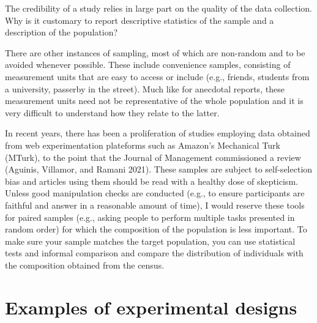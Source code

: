\documentclass[
  11pt,
  letterpaper,
]{scrbook}
\theoremstyle{definition}
\theoremstyle{definition}
\theoremstyle{remark}
\begin{document}
\begin{tcolorbox}[enhanced jigsaw, left=2mm, leftrule=.75mm, coltitle=black, breakable, bottomrule=.15mm, colframe=quarto-callout-note-color-frame, titlerule=0mm, colbacktitle=quarto-callout-note-color!10!white, rightrule=.15mm, toprule=.15mm, title=\textcolor{quarto-callout-note-color}{\faInfo}\hspace{0.5em}{Thinking outside the box}, opacityback=0, toptitle=1mm, bottomtitle=1mm, arc=.35mm, opacitybacktitle=0.6, colback=white]

The credibility of a study relies in large part on the quality of the
data collection. Why is it customary to report descriptive statistics of
the sample and a description of the population?

\end{tcolorbox}

There are other instances of sampling, most of which are non-random and
to be avoided whenever possible. These include convenience samples,
consisting of measurement units that are easy to access or include
(e.g., friends, students from a university, passerby in the street).
Much like for anecdotal reports, these measurement units need not be
representative of the whole population and it is very difficult to
understand how they relate to the latter.

In recent years, there has been a proliferation of studies employing
data obtained from web experimentation plateforms such as Amazon's
Mechanical Turk (MTurk), to the point that the Journal of Management
commissioned a review (Aguinis, Villamor, and Ramani 2021). These
samples are subject to self-selection bias and articles using them
should be read with a healthy dose of skepticism. Unless good
manipulation checks are conducted (e.g., to ensure participants are
faithful and answer in a reasonable amount of time), I would reserve
these tools for paired samples (e.g., asking people to perform multiple
tasks presented in random order) for which the composition of the
population is less important. To make sure your sample matches the
target population, you can use statistical tests and informal comparison
and compare the distribution of individuals with the composition
obtained from the census.

\section{Examples of experimental
designs}\label{examples-of-experimental-designs}
\end{document}
